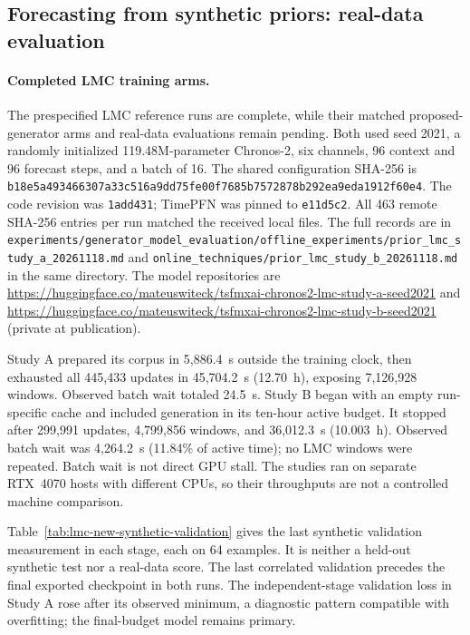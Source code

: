 ﻿\subsection{Forecasting from synthetic priors: real-data evaluation}
\label{sec:foundation-prior-results}

\paragraph{Completed LMC training arms.}
The prespecified LMC reference runs are complete, while their matched
proposed-generator arms and real-data evaluations remain pending. Both used
seed 2021, a randomly initialized 119.48M-parameter Chronos-2, six channels,
96 context and 96 forecast steps, and a batch of 16. The shared configuration
SHA-256 is
\texttt{b18e5a493466307a33c516a9dd75fe00f7685b7572878b292ea9eda1912f60e4}.
The code revision was \texttt{1add431}; TimePFN was pinned to \texttt{e11d5c2}.
All 463 remote SHA-256 entries per run matched the received local files.
The full records are in
\texttt{experiments/generator\_model\_evaluation/offline\_experiments/prior\_lmc\_study\_a\_20261118.md}
and \texttt{online\_techniques/prior\_lmc\_study\_b\_20261118.md} in the same directory. The model repositories are
\url{https://huggingface.co/mateuswiteck/tsfmxai-chronos2-lmc-study-a-seed2021}
and \url{https://huggingface.co/mateuswiteck/tsfmxai-chronos2-lmc-study-b-seed2021}
(private at publication).

Study A prepared its corpus in 5,886.4~s outside the training clock, then
exhausted all 445,433 updates in 45,704.2~s (12.70~h), exposing 7,126,928
windows. Observed batch wait totaled 24.5~s. Study B began with an empty
run-specific cache and included generation in its ten-hour active budget.
It stopped after 299,991 updates, 4,799,856 windows, and 36,012.3~s
(10.003~h). Observed batch wait was 4,264.2~s (11.84\% of active time);
no LMC windows were repeated. Batch wait is not direct GPU stall. The
studies ran on separate RTX~4070 hosts with different CPUs, so their
throughputs are not a controlled machine comparison.

Table~\ref{tab:lmc-new-synthetic-validation} gives the last synthetic
validation measurement in each stage, each on 64 examples. It is neither a
held-out synthetic test nor a real-data score. The last correlated validation
precedes the final exported checkpoint in both runs. The independent-stage
validation loss in Study A rose after its observed minimum, a diagnostic
pattern compatible with overfitting; the final-budget model remains primary.

